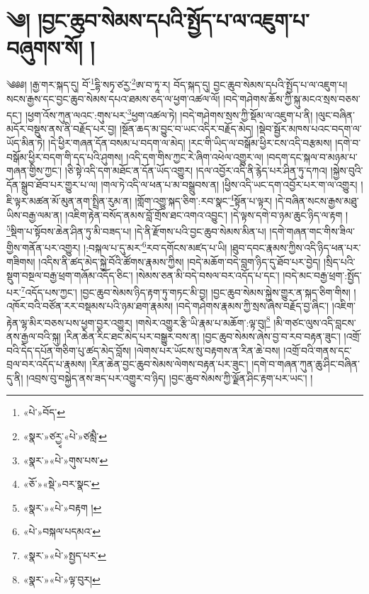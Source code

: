 \chapter{༄། །བྱང་ཆུབ་སེམས་དཔའི་སྤྱོད་པ་ལ་འཇུག་པ་བཞུགས་སོ། །}༄༅༅། །རྒྱ་གར་སྐད་དུ། བོ་\footnote{«པེ་»བོད་}དྷི་སཏྭ་ཙརྱ་\footnote{«སྣར་»ཙརྱྭ་«པེ་»ཙམླཻ་}ཨ་བ་ཏཱ་ར། བོད་སྐད་དུ། བྱང་ཆུབ་སེམས་དཔའི་སྤྱོད་པ་ལ་འཇུག་པ། སངས་རྒྱས་དང་བྱང་ཆུབ་སེམས་དཔའ་ཐམས་ཅད་ལ་ཕྱག་འཚལ་ལོ། །བདེ་གཤེགས་ཆོས་ཀྱི་སྐུ་མངའ་སྲས་བཅས་དང་། །ཕྱག་འོས་ཀུན་ལའང་:གུས་པར་\footnote{«སྣར་»«པེ་»གུས་པས་}ཕྱག་འཚལ་ཏེ། །བདེ་གཤེགས་སྲས་ཀྱི་སྡོམ་ལ་འཇུག་པ་ནི། །ལུང་བཞིན་མདོར་བསྡུས་ནས་ནི་བརྗོད་པར་བྱ། །སྔོན་ཆད་མ་བྱུང་བ་ཡང་འདིར་བརྗོད་མེད། །སྡེབ་སྦྱོར་མཁས་པའང་བདག་ལ་ཡོད་མིན་ཏེ། །དེ་ཕྱིར་གཞན་དོན་བསམ་པ་བདག་ལ་མེད། །རང་གི་ཡིད་ལ་བསྒོམ་ཕྱིར་ངས་འདི་བརྩམས། །དགེ་བ་བསྒོམ་ཕྱིར་བདག་གི་དད་པའི་ཤུགས། །འདི་དག་གིས་ཀྱང་རེ་ཞིག་འཕེལ་འགྱུར་ལ། །བདག་དང་སྐལ་བ་མཉམ་པ་གཞན་གྱིས་ཀྱང་། །ཅི་སྟེ་འདི་དག་མཐོང་ན་དོན་ཡོད་འགྱུར། །དལ་འབྱོར་འདི་ནི་རྙེད་པར་ཤིན་ཏུ་དཀའ། །སྐྱེས་བུའི་དོན་སྒྲུབ་ཐོབ་པར་གྱུར་པ་ལ། །གལ་ཏེ་འདི་ལ་ཕན་པ་མ་བསྒྲུབས་ན། །ཕྱིས་འདི་ཡང་དག་འབྱོར་པར་ག་ལ་འགྱུར། །ཇི་ལྟར་མཚན་མོ་མུན་ནག་སྤྲིན་རུམ་ན། །གློག་འགྱུ་སྐད་ཅིག་:རབ་སྣང་\footnote{«ཅོ་»«སྡེ་»བར་སྣང་}སྟོན་པ་ལྟར། །དེ་བཞིན་སངས་རྒྱས་མཐུ་ཡིས་བརྒྱ་ལམ་ན། །འཇིག་རྟེན་བསོད་ནམས་བློ་གྲོས་ཐང་འགའ་འབྱུང་། །དེ་ལྟས་དགེ་བ་ཉམ་ཆུང་ཉིད་ལ་རྟག །\footnote{«སྣར་»«པེ་»བརྟག །}སྡིག་པ་སྟོབས་ཆེན་ཤིན་ཏུ་མི་བཟད་པ། །དེ་ནི་རྫོགས་པའི་བྱང་ཆུབ་སེམས་མིན་པ། །དགེ་གཞན་གང་གིས་ཟིལ་གྱིས་གནོན་པར་འགྱུར། །:བསྐལ་པ་དུ་མར་\footnote{«པེ་»བསྐལ་པདམའ་}རབ་དགོངས་མཛད་པ་ཡི། །ཐུབ་དབང་རྣམས་ཀྱིས་འདི་ཉིད་ཕན་པར་གཟིགས། །འདིས་ནི་ཚད་མེད་སྐྱེ་བོའི་ཚོགས་རྣམས་ཀྱིས། །བདེ་མཆོག་བདེ་བླག་ཉིད་དུ་ཐོབ་པར་བྱེད། །སྲིད་པའི་སྡུག་བསྔལ་བརྒྱ་ཕྲག་གཞོམ་འདོད་ཅིང་། །སེམས་ཅན་མི་བདེ་བསལ་བར་འདོད་པ་དང་། །བདེ་མང་བརྒྱ་ཕྲག་:སྤྱོད་པར་\footnote{«སྣར་»«པེ་»སྤྱད་པར་}འདོད་པས་ཀྱང་། །བྱང་ཆུབ་སེམས་ཉིད་རྟག་ཏུ་གཏང་མི་བྱ། །བྱང་ཆུབ་སེམས་སྐྱེས་གྱུར་ན་སྐད་ཅིག་གིས། །འཁོར་བའི་བཙོན་རར་བསྡམས་པའི་ཉམ་ཐག་རྣམས། །བདེ་གཤེགས་རྣམས་ཀྱི་སྲས་ཞེས་བརྗོད་བྱ་ཞིང་། །འཇིག་རྟེན་ལྷ་མིར་བཅས་པས་ཕྱག་བྱར་འགྱུར། །གསེར་འགྱུར་རྩི་ཡི་རྣམ་པ་མཆོག་:ལྟ་བུ།\footnote{«སྣར་»«པེ་»ལྟ་བུར།} །མི་གཙང་ལུས་འདི་བླངས་ནས་རྒྱལ་བའི་སྐུ། །རིན་ཆེན་རིང་ཐང་མེད་པར་བསྒྱུར་བས་ན། །བྱང་ཆུབ་སེམས་ཞེས་བྱ་བ་རབ་བརྟན་ཟུང་། །འགྲོ་བའི་དེད་དཔོན་གཅིག་པུ་ཚད་མེད་བློས། །ལེགས་པར་ཡོངས་སུ་བརྟགས་ན་རིན་ཆེ་བས། །འགྲོ་བའི་གནས་དང་བྲལ་བར་འདོད་པ་རྣམས། །རིན་ཆེན་བྱང་ཆུབ་སེམས་ལེགས་བརྟན་པར་ཟུང་། །དགེ་བ་གཞན་ཀུན་ཆུ་ཤིང་བཞིན་དུ་ནི། །འབྲས་བུ་བསྐྱེད་ནས་ཟད་པར་འགྱུར་བ་ཉིད། །བྱང་ཆུབ་སེམས་ཀྱི་ལྗོན་ཤིང་རྟག་པར་ཡང་། །

